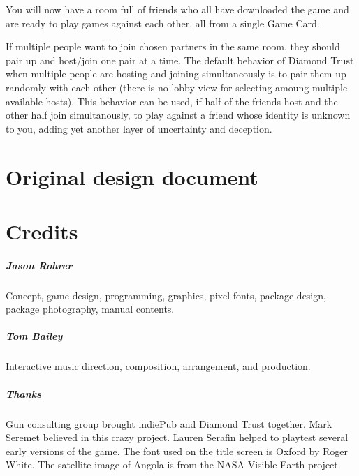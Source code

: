\documentclass[8pt]{extbook}
\begin{document}
You will now have a room full of friends who all have downloaded the game and are ready to play games against each other, all from a single Game Card.

If multiple people want to join chosen partners in the same room, they should pair up and host/join one pair at a time.  The default behavior of Diamond Trust when multiple people are hosting and joining simultaneously is to pair them up randomly with each other (there is no lobby view for selecting amoung multiple available hosts).  This behavior can be used, if half of the friends host and the other half join simultanously, to play against a friend whose identity is unknown to you, adding yet another layer of uncertainty and deception.



\part{Original design document}
\addtocounter{chapter}{1}
\setcounter{section}{0}





\part{Credits}
\addtocounter{chapter}{1}
\setcounter{section}{0}

\subsubsection{Jason Rohrer}
Concept, game design, programming, graphics, pixel fonts, package design, package photography, manual contents.

\subsubsection{Tom Bailey}
Interactive music direction, composition, arrangement, and production.

\subsubsection{Thanks}
Gun consulting group brought indiePub and Diamond Trust together.  Mark Seremet believed in this crazy project.  Lauren Serafin helped to playtest several early versions of the game.  The font used on the title screen is Oxford by Roger White.  The satellite image of Angola is from the NASA Visible Earth project.
\end{document}
